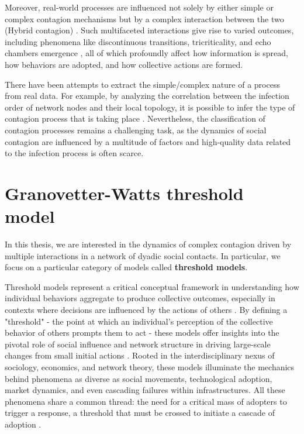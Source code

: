 Moreover, real-world processes are influenced not solely by either simple or complex contagion mechanisms but by a complex interaction between the two (Hybrid contagion) \cite{min-2018,diaz-diaz-2022}. Such multifaceted interactions give rise to varied outcomes, including phenomena like discontinuous transitions, tricriticality, and echo chambers emergence , all of which profoundly affect how information is spread, how behaviors are adopted, and how collective actions are formed.

There have been attempts to extract the simple/complex nature of a process from real data. For example, by analyzing the correlation between the infection order of network nodes and their local topology, it is possible to infer the type of contagion process that is taking place \cite{cencetti-2023}. Nevertheless, the classification of contagion processes remains a challenging task, as the dynamics of social contagion are influenced by a multitude of factors and high-quality data related to the infection process is often scarce.

\section{\label{sec:Granovetter-Watts threshold model} Granovetter-Watts threshold model}

In this thesis, we are interested in the dynamics of complex contagion driven by multiple interactions in a network of dyadic social contacts. In particular, we focus on a particular category of models called \textbf{threshold models}.

Threshold models represent a critical conceptual framework in understanding how individual behaviors aggregate to produce collective outcomes, especially in contexts where decisions are influenced by the actions of others \cite{granovetter-1973,granovetter-1978}. By defining a "threshold" - the point at which an individual's perception of the collective behavior of others prompts them to act - these models offer insights into the pivotal role of social influence and network structure in driving large-scale changes from small initial actions \cite{dodds-2004}. Rooted in the interdisciplinary nexus of sociology, economics, and network theory, these models illuminate the mechanics behind phenomena as diverse as social movements, technological adoption, market dynamics, and even cascading failures within infrastructures. All these phenomena share a common thread: the need for a critical mass of adopters to trigger a response, a threshold that must be crossed to initiate a cascade of adoption \cite{centola-2007,centola-2010}.

